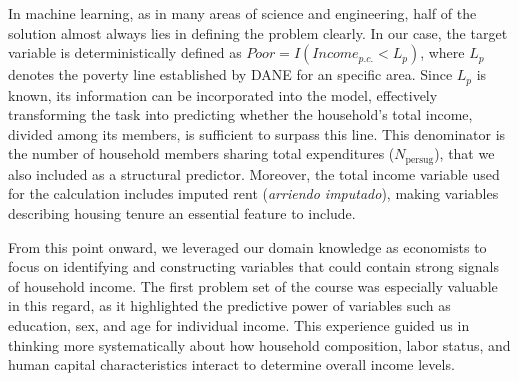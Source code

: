 \documentclass[12pt,a4paper,onecolumn]{article}
\begin{document}
In machine learning, as in many areas of science and engineering, half of the solution almost always lies in defining the problem clearly. In our case, the target variable is deterministically defined as
$Poor = I(Income_{p.c.} < L_p)$, where \(L_p\) denotes the poverty line established by DANE for an specific area. Since \(L_p\) is known, its information can be incorporated into the model, effectively transforming the task into predicting whether the household’s total income, divided among its members, is sufficient to surpass this line. This denominator is the number of household members sharing total expenditures (\(N_{\text{persug}}\)), that we also included as a structural predictor. Moreover, the total income variable used for the calculation includes imputed rent (\textit{arriendo imputado}), making variables describing housing tenure an essential feature to include.

From this point onward, we leveraged our domain knowledge as economists to focus on identifying and constructing variables that could contain strong signals of household income. The first problem set of the course was especially valuable in this regard, as it highlighted the predictive power of variables such as education, sex, and age for individual income. This experience guided us in thinking more systematically about how household composition, labor status, and human capital characteristics interact to determine overall income levels.

\newcommand{\meanse}[2]{%
  \begin{tabular}{@{}c@{}}%
    #1\\[-0.1ex]\footnotesize(#2)%
  \end{tabular}%
}

\setlength{\tabcolsep}{2.5pt}  %
\renewcommand{\arraystretch}{1.03}
\end{document}
